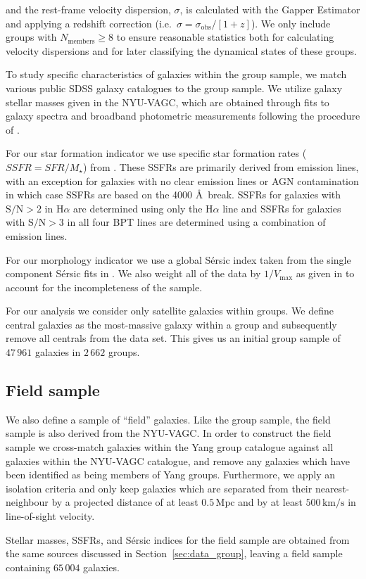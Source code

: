\documentclass[a4paper,fleqn,usenatbib]{mnras}
\begin{document}
\noindent
and the rest-frame velocity dispersion, $\sigma$, is calculated with the Gapper Estimator
\citep{beers1990} and applying a redshift correction (i.e.\ $\sigma =
\sigma_\mathrm{obs}/[1+z]$).  We only include groups with
$N_\mathrm{members} \ge 8$ to ensure reasonable statistics both for
calculating velocity dispersions and for later classifying the
dynamical states of these groups.
\par
To study specific characteristics of galaxies within the group
sample, we match various public SDSS galaxy catalogues to the group
sample.  We utilize galaxy stellar masses given in the NYU-VAGC, which
are obtained through fits to galaxy spectra and broadband photometric
measurements following the procedure of \citet{blanton2007}.
\par
For our star formation indicator we use specific star formation rates
($SSFR = SFR/M_\star$) from \citet{brinchmann2004}.  These SSFRs are
primarily derived from emission lines, with an exception for galaxies
with no clear emission lines or AGN contamination in which case SSFRs
are based on the 4000 \AA\ break.  SSFRs for galaxies with $\text{S/N}
> 2$ in H$\alpha$ are determined using only the H$\alpha$ line and
SSFRs for galaxies with $\text{S/N} > 3$ in all four BPT lines are
determined using a combination of emission lines.
\par
For our morphology indicator we use a global S\'{e}rsic
index taken from the single component S\'{e}rsic fits in
\citet{simard2011}.  We also weight all of the data by
$1/V_\text{max}$ as given in \citet{simard2011} to account for the
incompleteness of the sample.
\par
For our analysis we consider only satellite galaxies within groups.
We define central galaxies as the most-massive galaxy within a group
and subsequently remove all centrals from the data set.  This gives us
an initial group sample of $47\,961$ galaxies in $2\,662$ groups.

\subsection{Field sample}

We also define a sample of ``field'' galaxies.  Like
the group sample, the field sample is also derived from the NYU-VAGC.
In order to construct the field sample we cross-match galaxies within
the Yang group catalogue against all galaxies within the NYU-VAGC
catalogue, and remove any galaxies which have been identified as being
members of Yang groups.  Furthermore, we apply an isolation
criteria and only keep galaxies which are separated from their
nearest-neighbour by a projected distance of at least
$0.5\,\mathrm{Mpc}$ and by at least $500\,\mathrm{km/s}$ in
line-of-sight velocity.
\par
Stellar masses, SSFRs, and S{\'e}rsic indices for the field sample are
obtained from the same sources discussed in
Section~\ref{sec:data_group}, leaving a field sample containing
$65\,004$ galaxies.
\end{document}
